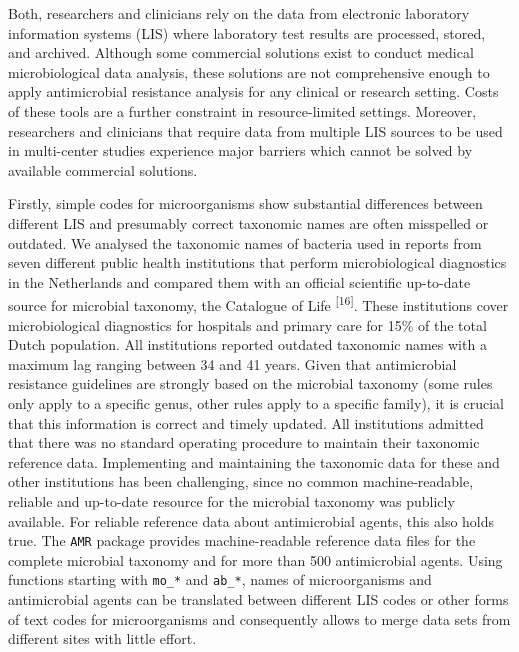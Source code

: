 \documentclass[
]{book}
\begin{document}
Both, researchers and clinicians rely on the data from electronic laboratory information systems (LIS) where laboratory test results are processed, stored, and archived. Although some commercial solutions exist to conduct medical microbiological data analysis, these solutions are not comprehensive enough to apply antimicrobial resistance analysis for any clinical or research setting. Costs of these tools are a further constraint in resource-limited settings. Moreover, researchers and clinicians that require data from multiple LIS sources to be used in multi-center studies experience major barriers which cannot be solved by available commercial solutions.

Firstly, simple codes for microorganisms show substantial differences between different LIS and presumably correct taxonomic names are often misspelled or outdated. We analysed the taxonomic names of bacteria used in reports from seven different public health institutions that perform microbiological diagnostics in the Netherlands and compared them with an official scientific up-to-date source for microbial taxonomy, the Catalogue of Life \textsuperscript{{[}16{]}}. These institutions cover microbiological diagnostics for hospitals and primary care for 15\% of the total Dutch population. All institutions reported outdated taxonomic names with a maximum lag ranging between 34 and 41 years. Given that antimicrobial resistance guidelines are strongly based on the microbial taxonomy (some rules only apply to a specific genus, other rules apply to a specific family), it is crucial that this information is correct and timely updated. All institutions admitted that there was no standard operating procedure to maintain their taxonomic reference data. Implementing and maintaining the taxonomic data for these and other institutions has been challenging, since no common machine-readable, reliable and up-to-date resource for the microbial taxonomy was publicly available. For reliable reference data about antimicrobial agents, this also holds true. The \texttt{AMR} package provides machine-readable reference data files for the complete microbial taxonomy and for more than 500 antimicrobial agents. Using functions starting with \texttt{mo\_*} and \texttt{ab\_*}, names of microorganisms and antimicrobial agents can be translated between different LIS codes or other forms of text codes for microorganisms and consequently allows to merge data sets from different sites with little effort.
\end{document}
